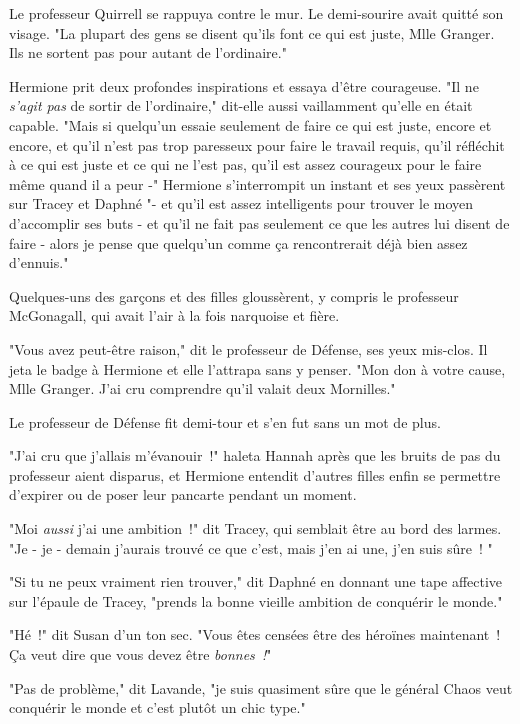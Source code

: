 Le professeur Quirrell se rappuya contre le mur. Le demi-sourire avait quitté son visage. "La plupart des gens se disent qu'ils font ce qui est juste, Mlle Granger. Ils ne sortent pas pour autant de l'ordinaire."

Hermione prit deux profondes inspirations et essaya d'être courageuse. "Il ne \emph{s'agit pas} de sortir de l'ordinaire," dit-elle aussi vaillamment qu'elle en était capable. "Mais si quelqu'un essaie seulement de faire ce qui est juste, encore et encore, et qu'il n'est pas trop paresseux pour faire le travail requis, qu'il réfléchit à ce qui est juste et ce qui ne l'est pas, qu'il est assez courageux pour le faire même quand il a peur -" Hermione s'interrompit un instant et ses yeux passèrent sur Tracey et Daphné "- et qu'il est assez intelligents pour trouver le moyen d'accomplir ses buts - et qu'il ne fait pas seulement ce que les autres lui disent de faire - alors je pense que quelqu'un comme ça rencontrerait déjà bien assez d'ennuis."

Quelques-uns des garçons et des filles gloussèrent, y compris le professeur McGonagall, qui avait l'air à la fois narquoise et fière.

"Vous avez peut-être raison," dit le professeur de Défense, ses yeux mis-clos. Il jeta le badge à Hermione et elle l'attrapa sans y penser. "Mon don à votre cause, Mlle Granger. J'ai cru comprendre qu'il valait deux Mornilles."

Le professeur de Défense fit demi-tour et s'en fut sans un mot de plus.

"J'ai cru que j'allais m'évanouir~!" haleta Hannah après que les bruits de pas du professeur aient disparus, et Hermione entendit d'autres filles enfin se permettre d'expirer ou de poser leur pancarte pendant un moment.

"Moi \emph{aussi} j'ai une ambition~!" dit Tracey, qui semblait être au bord des larmes. "Je - je - demain j'aurais trouvé ce que c'est, mais j'en ai une, j'en suis sûre~! "

"Si tu ne peux vraiment rien trouver," dit Daphné en donnant une tape affective sur l'épaule de Tracey, "prends la bonne vieille ambition de conquérir le monde."

"Hé~!" dit Susan d'un ton sec. "Vous êtes censées être des héroïnes maintenant~! Ça veut dire que vous devez être \emph{bonnes~!}"

"Pas de problème," dit Lavande, "je suis quasiment sûre que le général Chaos veut conquérir le monde et c'est plutôt un chic type."


